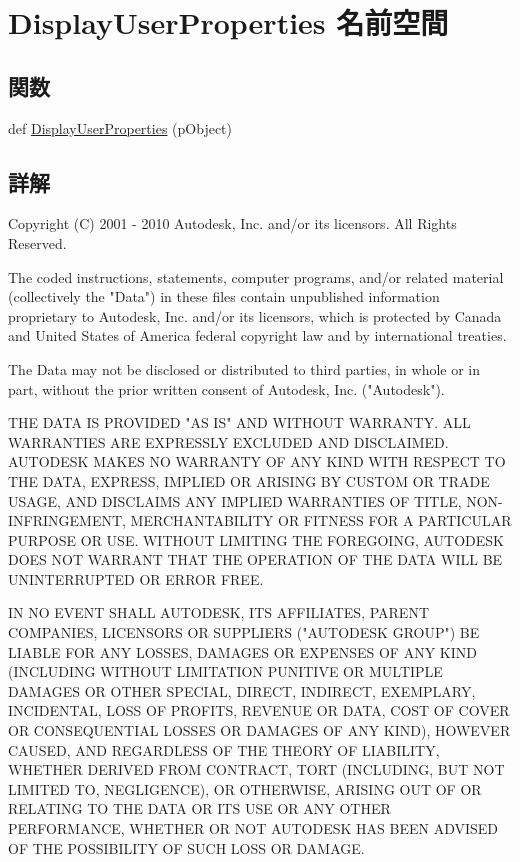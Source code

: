 \hypertarget{namespace_display_user_properties}{}\section{Display\+User\+Properties 名前空間}
\label{namespace_display_user_properties}
\subsection*{関数}
\begin{DoxyCompactItemize}
\item 
def \hyperlink{namespace_display_user_properties_a7f8a97449fa115aa712358522aee0e90}{Display\+User\+Properties} (p\+Object)
\end{DoxyCompactItemize}


\subsection{詳解}
\begin{DoxyVerb} Copyright (C) 2001 - 2010 Autodesk, Inc. and/or its licensors.
 All Rights Reserved.

 The coded instructions, statements, computer programs, and/or related material 
 (collectively the "Data") in these files contain unpublished information 
 proprietary to Autodesk, Inc. and/or its licensors, which is protected by 
 Canada and United States of America federal copyright law and by international 
 treaties. 
 
 The Data may not be disclosed or distributed to third parties, in whole or in
 part, without the prior written consent of Autodesk, Inc. ("Autodesk").

 THE DATA IS PROVIDED "AS IS" AND WITHOUT WARRANTY.
 ALL WARRANTIES ARE EXPRESSLY EXCLUDED AND DISCLAIMED. AUTODESK MAKES NO
 WARRANTY OF ANY KIND WITH RESPECT TO THE DATA, EXPRESS, IMPLIED OR ARISING
 BY CUSTOM OR TRADE USAGE, AND DISCLAIMS ANY IMPLIED WARRANTIES OF TITLE, 
 NON-INFRINGEMENT, MERCHANTABILITY OR FITNESS FOR A PARTICULAR PURPOSE OR USE. 
 WITHOUT LIMITING THE FOREGOING, AUTODESK DOES NOT WARRANT THAT THE OPERATION
 OF THE DATA WILL BE UNINTERRUPTED OR ERROR FREE. 
 
 IN NO EVENT SHALL AUTODESK, ITS AFFILIATES, PARENT COMPANIES, LICENSORS
 OR SUPPLIERS ("AUTODESK GROUP") BE LIABLE FOR ANY LOSSES, DAMAGES OR EXPENSES
 OF ANY KIND (INCLUDING WITHOUT LIMITATION PUNITIVE OR MULTIPLE DAMAGES OR OTHER
 SPECIAL, DIRECT, INDIRECT, EXEMPLARY, INCIDENTAL, LOSS OF PROFITS, REVENUE
 OR DATA, COST OF COVER OR CONSEQUENTIAL LOSSES OR DAMAGES OF ANY KIND),
 HOWEVER CAUSED, AND REGARDLESS OF THE THEORY OF LIABILITY, WHETHER DERIVED
 FROM CONTRACT, TORT (INCLUDING, BUT NOT LIMITED TO, NEGLIGENCE), OR OTHERWISE,
 ARISING OUT OF OR RELATING TO THE DATA OR ITS USE OR ANY OTHER PERFORMANCE,
 WHETHER OR NOT AUTODESK HAS BEEN ADVISED OF THE POSSIBILITY OF SUCH LOSS
 OR DAMAGE. \end{DoxyVerb}
 

